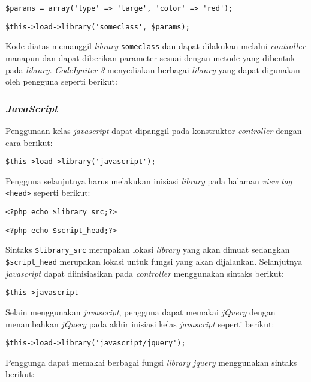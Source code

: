 \begin{center}
\verb|$params = array('type' => 'large', 'color' => 'red');|

\verb|$this->load->library('someclass', $params);|
\end{center} 

Kode diatas memanggil \textit{library} \texttt{someclass} dan dapat dilakukan melalui \textit{controller} manapun dan dapat diberikan parameter sesuai dengan metode yang dibentuk pada \textit{library}. \textit{CodeIgniter 3} menyediakan berbagai \textit{library} yang dapat digunakan oleh pengguna seperti berikut:

\subsubsection{\textit{JavaScript}}
Penggunaan kelas \textit{javascript} dapat dipanggil pada konstruktor \textit{controller} dengan cara berikut:

\begin{center}
\verb|$this->load->library('javascript');|
\end{center}

Pengguna selanjutnya harus melakukan inisiasi \textit{library} pada halaman \textit{view tag} \verb|<head>| seperti berikut:

\begin{center}
\verb|<?php echo $library_src;?>|

\verb|<?php echo $script_head;?>|
\end{center}

Sintaks \verb|$library_src| merupakan lokasi \textit{library} yang akan dimuat sedangkan \verb|$script_head| merupakan lokasi untuk fungsi yang akan dijalankan. Selanjutnya \textit{javascript} dapat diinisiasikan pada \textit{controller} menggunakan sintaks berikut:

\begin{center}
	\verb|$this->javascript|
\end{center}

Selain menggunakan \textit{javascript}, pengguna dapat memakai \textit{jQuery} dengan menambahkan \textit{jQuery} pada akhir inisiasi kelas \textit{javascript} seperti berikut:

\begin{center}
\verb|$this->load->library('javascript/jquery');|
\end{center}

Penggunga dapat memakai berbagai fungsi \textit{library jquery} menggunakan sintaks berikut:

